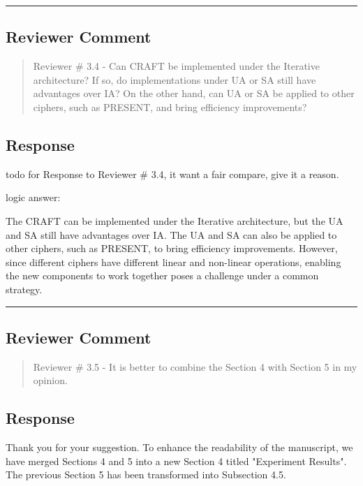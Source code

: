 \noindent\rule{\linewidth}{2.0pt}

\subsection{Reviewer Comment}
\begin{mdframed}
	\begin{quote}
		Reviewer \# 3.4 - Can CRAFT be implemented under the Iterative architecture? If so, do implementations under UA or SA still have advantages over IA? On the other hand, can UA or SA be applied to other ciphers, such as PRESENT, and bring efficiency improvements?
	\end{quote}
\end{mdframed}

\subsection{Response}

todo for Response to Reviewer \# 3.4, it want a fair compare, give it a reason.

logic answer:

The CRAFT can be implemented under the Iterative architecture, but the UA and SA still have advantages over IA. The UA and SA can also be applied to other ciphers, such as PRESENT, to bring efficiency improvements. However, since different ciphers have different linear and non-linear operations, enabling the new components to work together poses a challenge under a common strategy.

\noindent\rule{\linewidth}{2.0pt}

\subsection{Reviewer Comment}
\begin{mdframed}
	\begin{quote}
		Reviewer \# 3.5 - It is better to combine the Section 4 with Section 5 in my opinion.
	\end{quote}
\end{mdframed}

\subsection{Response}

Thank you for your suggestion. To enhance the readability of the manuscript, we have merged Sections 4 and 5 into a new Section 4 titled "Experiment Results". The previous Section 5 has been transformed into Subsection 4.5.

